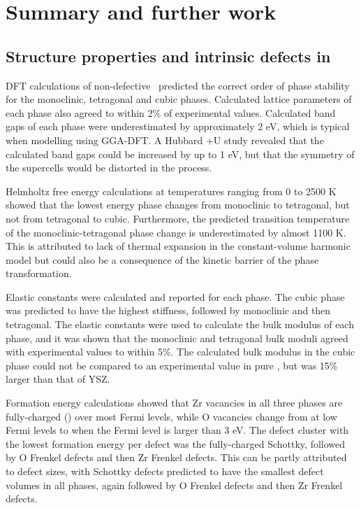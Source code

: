 \chapter{Summary and further work}

\label{ch:summary}

\section{Structure properties and intrinsic defects in \zirconia}

DFT calculations of non-defective \zirconia\ predicted the correct order of phase stability for the monoclinic, tetragonal and cubic phases. Calculated lattice parameters of each phase also agreed to within 2\% of experimental values. Calculated band gaps of each phase were underestimated by approximately 2 eV, which is typical when modelling using GGA-DFT. A Hubbard +U study revealed that the calculated band gaps could be increased by up to 1 eV, but that the symmetry of the supercells would be distorted in the process.

Helmholtz free energy calculations at temperatures ranging from 0 to 2500 K showed that the lowest energy phase changes from monoclinic to tetragonal, but not from tetragonal to cubic. Furthermore, the predicted transition temperature of the monoclinic-tetragonal phase change is underestimated by almost 1100 K. This is attributed to lack of thermal expansion in the constant-volume harmonic model but could also be a consequence of the kinetic barrier of the phase transformation.

Elastic constants were calculated and reported for each phase. The cubic phase was predicted to have the highest stiffness, followed by monoclinic and then tetragonal. The elastic constants were used to calculate the bulk modulus of each phase, and it was shown that the monoclinic and tetragonal bulk moduli agreed with experimental values to within 5\%. The calculated bulk modulus in the cubic phase could not be compared to an experimental value in pure \zirconia , but was 15\% larger than that of YSZ.

Formation energy calculations showed that Zr vacancies in all three phases are fully-charged () over most Fermi levels, while O vacancies change from  at low Fermi levels to  when the Fermi level is larger than 3 eV. The defect cluster with the lowest formation energy per defect was the fully-charged Schottky, followed by O Frenkel defects and then Zr Frenkel defects. This can be partly attributed to defect sizes, with Schottky defects predicted to have the smallest defect volumes in all phases, again followed by O Frenkel defects and then Zr Frenkel defects.

